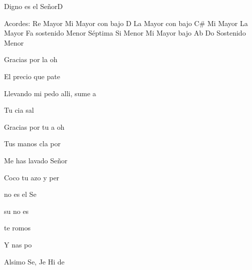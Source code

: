 \documentclass[12pt, spanish]{book}
\begin{document}
\begin{song}{Digno es el Señor}{D}
        \ifChordBk
        \begin{SBOpGroup}
            Acordes:\break
            \upchord{\D}\qquad Re Mayor \hfill
            \upchord{\ED}\qquad Mi Mayor con bajo D \hfill\null\break
            \upchord{\ACs}\qquad La Mayor con bajo C\# \hfill
            \upchord{\E}Mi Mayor \hfill\null\break
            \upchord{\A}\qquad La Mayor \hfill
            \upchord{\Fsmseven}Fa sostenido Menor S\'eptima \hfill\null\break
            \upchord{\Bm}\qquad\qquad Si Menor \hfill
            \upchord{\EAflat}\qquad Mi Mayor bajo Ab \hfill\null\break
            \upchord{\Csm}\qquad Do Sostenido Menor \hfill\null\break
        \end{SBOpGroup}
        \clearpage
        \fi
        \begin{SBExtraKeys}{

            \begin{SBOpGroup}
                Gracias por la  oh 

                El precio que pate  

                Llevando mi pedo alli, sume a

                Tu cia  sal
            \end{SBOpGroup}
            \vskip 20pt
            \begin{SBOpGroup}
                Gracias por tu a oh 

                Tus manos cla por 

                Me has lavado  Señor

                Coco  tu azo y  per
            \end{SBOpGroup}

            \begin{SBChorus}
                no es el Se

                 su no es

                 te romos 

                Y nas  po

                Alsimo Se, Je Hi de 


\end{SBChorus}}
\end{SBExtraKeys}
\end{song}
\end{document}
